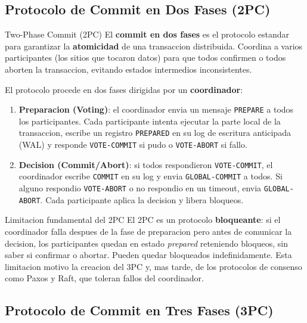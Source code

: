 \documentclass[11pt,a4paper]{article}
\begin{document}
\subsection{Protocolo de Commit en Dos Fases (2PC)}

\begin{defbox}{Two-Phase Commit (2PC)}
El \textbf{commit en dos fases} es el protocolo estandar para garantizar la \textbf{atomicidad} de una transaccion distribuida. Coordina a varios participantes (los sitios que tocaron datos) para que todos confirmen o todos aborten la transaccion, evitando estados intermedios inconsistentes.
\end{defbox}

El protocolo procede en dos fases dirigidas por un \textbf{coordinador}:

\begin{enumerate}[label=\textbf{Fase \arabic*:},leftmargin=*]
\item \textbf{Preparacion (Voting)}: el coordinador envia un mensaje \texttt{PREPARE} a todos los participantes. Cada participante intenta ejecutar la parte local de la transaccion, escribe un registro \texttt{PREPARED} en su log de escritura anticipada (WAL) y responde \texttt{VOTE-COMMIT} si pudo o \texttt{VOTE-ABORT} si fallo.
\item \textbf{Decision (Commit/Abort)}: si todos respondieron \texttt{VOTE-COMMIT}, el coordinador escribe \texttt{COMMIT} en su log y envia \texttt{GLOBAL-COMMIT} a todos. Si alguno respondio \texttt{VOTE-ABORT} o no respondio en un timeout, envia \texttt{GLOBAL-ABORT}. Cada participante aplica la decision y libera bloqueos.
\end{enumerate}

\begin{notebox}{Limitacion fundamental del 2PC}
El 2PC es un protocolo \textbf{bloqueante}: si el coordinador falla despues de la fase de preparacion pero antes de comunicar la decision, los participantes quedan en estado \textit{prepared} reteniendo bloqueos, sin saber si confirmar o abortar. Pueden quedar bloqueados indefinidamente. Esta limitacion motivo la creacion del 3PC y, mas tarde, de los protocolos de consenso como Paxos y Raft, que toleran fallos del coordinador.
\end{notebox}

\subsection{Protocolo de Commit en Tres Fases (3PC)}
\end{document}
